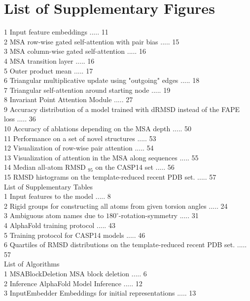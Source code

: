 \documentclass[10pt]{article}
\begin{document}
\section*{List of Supplementary Figures}
1 Input feature embeddings ..... 11\\
2 MSA row-wise gated self-attention with pair bias ..... 15\\
3 MSA column-wise gated self-attention ..... 16\\
4 MSA transition layer ..... 16\\
5 Outer product mean ..... 17\\
6 Triangular multiplicative update using "outgoing" edges ..... 18\\
7 Triangular self-attention around starting node ..... 19\\
8 Invariant Point Attention Module ..... 27\\
9 Accuracy distribution of a model trained with dRMSD instead of the FAPE loss ..... 36\\
10 Accuracy of ablations depending on the MSA depth ..... 50\\
11 Performance on a set of novel structures ..... 53\\
12 Visualization of row-wise pair attention ..... 54\\
13 Visualization of attention in the MSA along sequences ..... 55\\
14 Median all-atom RMSD ${ }_{95}$ on the CASP14 set ..... 56\\
15 RMSD histograms on the template-reduced recent PDB set. ..... 57\\
List of Supplementary Tables\\
1 Input features to the model ..... 8\\
2 Rigid groups for constructing all atoms from given torsion angles ..... 24\\
3 Ambiguous atom names due to $180^{\circ}$-rotation-symmetry ..... 31\\
4 AlphaFold training protocol ..... 43\\
5 Training protocol for CASP14 models ..... 46\\
6 Quartiles of RMSD distributions on the template-reduced recent PDB set. ..... 57\\
List of Algorithms\\
1 MSABlockDeletion MSA block deletion ..... 6\\
2 Inference AlphaFold Model Inference ..... 12\\
3 InputEmbedder Embeddings for initial representations ..... 13\\
\end{document}
